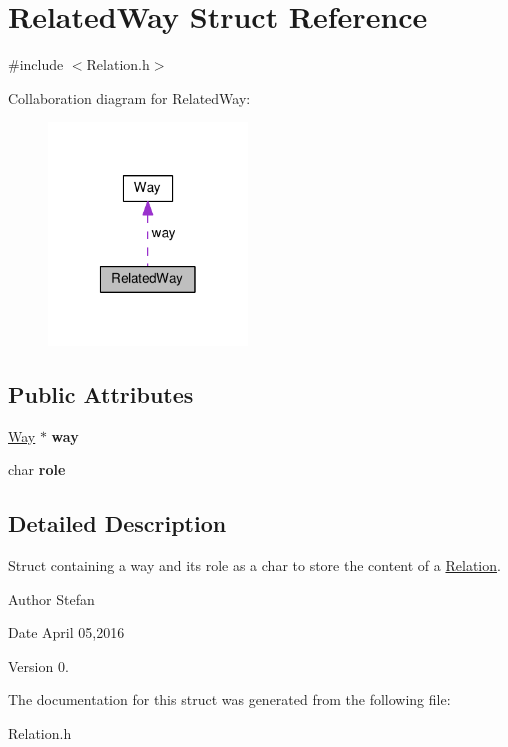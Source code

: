\hypertarget{structRelatedWay}{\section{Related\-Way Struct Reference}
\label{structRelatedWay}
}


{\ttfamily \#include $<$Relation.\-h$>$}



Collaboration diagram for Related\-Way\-:
\nopagebreak
\begin{figure}[H]
\begin{center}
\leavevmode
\includegraphics[width=150pt]{structRelatedWay__coll__graph}
\end{center}
\end{figure}
\subsection*{Public Attributes}
\begin{DoxyCompactItemize}
\item 
\hypertarget{structRelatedWay_a5619ada94091c326e4c9440af36a746d}{\hyperlink{classWay}{Way} $\ast$ {\bfseries way}}\label{structRelatedWay_a5619ada94091c326e4c9440af36a746d}

\item 
\hypertarget{structRelatedWay_a92361bcfbff070d7ce5bdcd78193db6e}{char {\bfseries role}}\label{structRelatedWay_a92361bcfbff070d7ce5bdcd78193db6e}

\end{DoxyCompactItemize}


\subsection{Detailed Description}
Struct containing a way and its role as a char to store the content of a \hyperlink{classRelation}{Relation}.

\begin{DoxyAuthor}{Author}
Stefan 
\end{DoxyAuthor}
\begin{DoxyDate}{Date}
April 05,2016 
\end{DoxyDate}
\begin{DoxyVersion}{Version}
0. 
\end{DoxyVersion}


The documentation for this struct was generated from the following file\-:\begin{DoxyCompactItemize}
\item 
Relation.\-h\end{DoxyCompactItemize}
